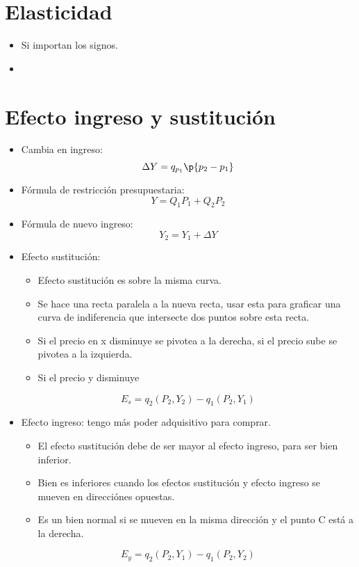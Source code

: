 \section{Elasticidad}
\begin{itemize}
    \item Si importan los signos.
    \item 
\end{itemize}


\section{Efecto ingreso y sustitución}
\begin{itemize}
    \item Cambia en ingreso:
        \[
          \Delta Y = q_{p_1} \p{p_2-p_1} 
        \]
    
    \item Fórmula de restricción presupuestaria:
        \[
          Y = Q_1P_1+Q_2P_2
        \]
    
    \item Fórmula de nuevo ingreso:
        \[
          Y_2 = Y_1 + \Delta Y
        \]
    
    \item Efecto sustitución: 
        \begin{itemize}
            \item Efecto sustitución es sobre la misma curva.
            \item Se hace una recta paralela a la nueva recta, usar esta para graficar una curva de indiferencia que intersecte dos puntos sobre esta recta.
            \item Si el precio en x disminuye se pivotea a la derecha, si el precio sube se pivotea a la izquierda.
            \item Si el precio y disminuye 
        \end{itemize}
        \[
          E_s = q_2(P_2,Y_2) - q_1(P_2,Y_1)
        \]
    
    \item Efecto ingreso: tengo más poder adquisitivo para comprar.
        \begin{itemize}
            \item El efecto sustitución debe de ser mayor al efecto ingreso, para ser bien inferior.
            \item Bien es inferiores cuando los efectos sustitución y efecto ingreso se mueven en direcciónes opuestas.
            \item Es un bien normal si se mueven en la misma dirección y el punto C está a la derecha.
        \end{itemize}
        \[
          E_y = q_2(P_2,Y_1)-q_1(P_2,Y_2)
        \]
    

\end{itemize}
